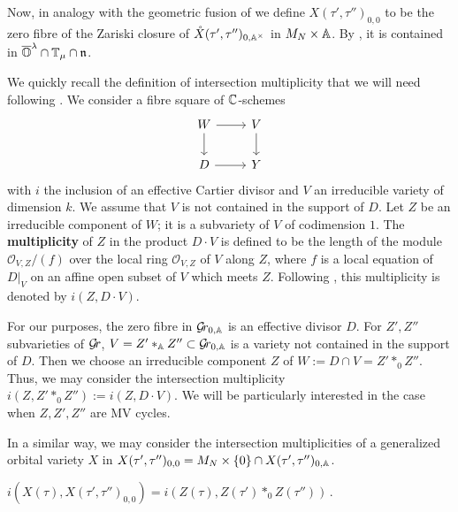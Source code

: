 \documentclass[draft]{article} %
\begin{document}
Now, in analogy with the geometric fusion of 
we define $X(\tau', \tau'')_{0,0} $ to be the zero fibre of the Zariski closure of $\mathring X(\tau',\tau'')_{0,\AA^\times}$ in $M_N \times\AA$. By , it is contained in $\overline\OO^\lambda\cap\TT_\mu\cap\n$. 

We quickly recall the
definition of intersection multiplicity that we will need following \cite[Example~2.6.5]{fulton2016intersection}. We consider a fibre square of $\CC$-schemes
$$
\begin{tikzcd}
   W\ar[r]\ar[d]&V\ar[d]\\D\ar[r]&Y
\end{tikzcd}
$$
with $i$ the inclusion of an effective Cartier divisor and $V$ an
irreducible variety of dimension $k$. We assume that $V$ is not contained
in the support of $D$. Let $Z$ be an irreducible component of $W$;
it is a subvariety of $V$ of codimension $1$. The \textbf{multiplicity}
of $Z$ in the product $D\cdot V$ is defined to be the length of the
module $\mathcal O_{V,Z}/(f)$ over the local ring $\mathcal O_{V,Z}$
of $V$ along $Z$, where $f$ is a local equation of $D|_V$ on an affine
open subset of $V$ which meets $Z$. Following \cite[chap.~7]{fulton2016intersection},
this multiplicity is denoted by $i(Z,D\cdot V)$.  

For our purposes, the zero fibre in $\Grbd$ is an effective divisor $D$.   For $ Z', Z'' $ subvarieties of $ \Gr $, $V = Z'\ast_\AA Z''\subset\Grbd$ is a variety not contained in the support of $D$.  Then we choose an irreducible component $Z$ of $W := D \cap V = Z'\ast_0 Z''$.  Thus, we may consider the intersection multiplicity $ i(Z, Z'\ast_0 Z'') := i(Z, D \cdot V)$.  We will be particularly interested in the case when $ Z, Z', Z''$ are MV cycles.

In a similar way, we may consider the intersection multiplicities of a generalized orbital variety $ X$ in $X(\tau', \tau'')_{0,0} = M_N \times \{0\} \cap X(\tau', \tau'')_{0, \AA}$.
\begin{corollary}
\label{cor:intmul}
    $i(X(\tau), X(\tau',\tau'')_{0,0}) = i( Z(\tau), Z(\tau')\ast_0 Z(\tau''))\,.$
\end{corollary}
%
\end{document}
